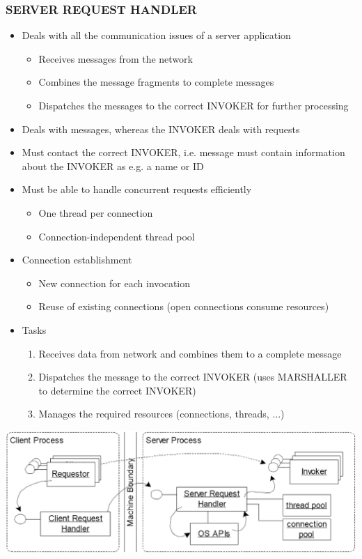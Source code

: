 \documentclass[10pt]{article}
\begin{document}
\subsubsection{SERVER REQUEST HANDLER}
\begin{itemize}
	\item Deals with all the communication issues of a server application
		\begin{itemize}
			\item Receives messages from the network
			\item Combines the message fragments to complete messages
			\item Dispatches the messages to the correct INVOKER for further processing
		\end{itemize}
	\item Deals with messages, whereas the INVOKER deals with requests
	\item Must contact the correct INVOKER, i.e. message must contain information about the INVOKER as e.g. a name or ID
	\item Must be able to handle concurrent requests efficiently
		\begin{itemize}
			\item One thread per connection
			\item Connection-independent thread pool
		\end{itemize}
	\item Connection establishment
		\begin{itemize}
			\item New connection for each invocation
			\item Reuse of existing connections (open connections consume resources)		
		\end{itemize}
	\item Tasks
		\begin{enumerate}
			\item Receives data from network and combines them to a complete message
			\item Dispatches the message to the correct INVOKER (uses MARSHALLER to determine the correct INVOKER)
			\item Manages the required resources (connections, threads, ...)
		\end{enumerate}
\end{itemize}
\begin{center}
	\includegraphics[scale=0.2]{server-request-handler.png}
\end{center}
\end{document}

